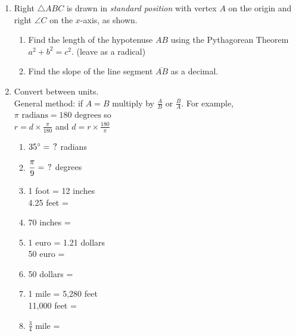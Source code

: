 \documentclass[12pt, twoside]{article}
\begin{document}
\begin{enumerate}
\newpage
\item Right $\triangle ABC$ is drawn in \emph{standard position} with vertex $A$ on the origin and right $\angle C$ on the $x$-axis, as shown.
\begin{multicols}{2}
  \raggedcolumns
\begin{enumerate}
  \item Find the length of the hypotenuse $AB$ using the Pythagorean Theorem $a^2 + b^2 = c^2$. (leave as a radical)
  \vspace{3cm}
  \item Find the slope of the line segment $\overline{AB}$ as a decimal.
\end{enumerate}
\end{multicols}

\newpage
\item Convert between units. \\[0.25cm]
General method: if $A = B$ multiply by $\displaystyle \frac{A}{B} \text{ or } \frac{B}{A}$. For example, $\pi \text{ radians}= 180 \text{ degrees}$ so \\
$\displaystyle r = d \times \frac{\pi}{180}$ and 
$\displaystyle d = r \times \frac{180}{\pi}$
\vspace{0.5cm}
  \begin{multicols}{2}
  \raggedcolumns
  \begin{enumerate}[itemsep=1.5cm]
    \item $35^\circ = \hspace{0.15cm} ?$ radians
    \item $\displaystyle \frac{\pi}{9}  = \hspace{0.15cm} ?$ degrees
    \item 1 foot = 12 inches\\[0.5cm]
    4.25 feet = 
    \item 70 inches = 
    \item 1 euro = 1.21 dollars\\[0.5cm]
    50 euro = 
    \item 50 dollars = 
    \item 1 mile = 5,280 feet\\[0.5cm]
    11,000 feet = 
    \item $\displaystyle \frac{3}{4}$ mile =   
  \end{enumerate}
  \end{multicols}
    

\end{enumerate}
\end{document}
